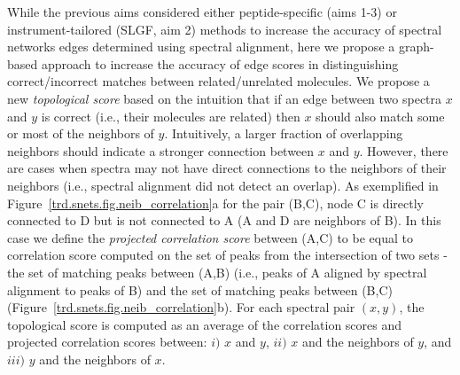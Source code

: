\documentclass[arial,11pt]{article}
\begin{document}
While the previous aims considered either peptide-specific (aims 1-3) or instrument-tailored (SLGF, aim 2) methods to increase the accuracy of spectral networks edges determined using spectral alignment, here we propose a graph-based approach to increase the accuracy of edge scores in distinguishing correct/incorrect matches between related/unrelated molecules.
We propose a new \emph{topological score} based on the intuition that if an edge between two spectra $x$ and $y$ is correct (i.e., their molecules are related) then $x$ should also match some or most of the neighbors of $y$. Intuitively, a larger fraction of overlapping neighbors should indicate a stronger connection between $x$ and $y$. However, there are cases when spectra may not have direct connections to the neighbors of their neighbors (i.e., spectral alignment did not detect an overlap). As exemplified in Figure~\ref{trd.snets.fig.neib_correlation}a for the pair (B,C), node C is directly connected to D but is not connected to A (A and D are neighbors of B). In this case we define the \emph{projected correlation score} between (A,C) to be equal to correlation score computed on the set of peaks from the intersection of two sets - the set of matching peaks between (A,B) (i.e., peaks of A aligned by spectral alignment to peaks of B) and the set of matching peaks between (B,C) (Figure~\ref{trd.snets.fig.neib_correlation}b). For each spectral pair $(x,y)$, the topological score is computed as an average of the correlation scores and projected correlation scores between: $i)$ $x$ and $y$, $ii)$ $x$ and the neighbors of $y$, and $iii)$ $y$ and the neighbors of $x$.
\end{document}
